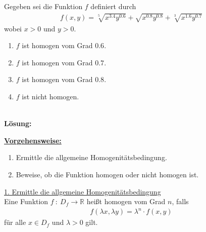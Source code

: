 \subsection*{}
Gegeben sei die Funktion $f$ definiert durch
\begin{align*}
f(x,y) = \sqrt[5]{x^{3.4}y^{0.6}}+ \sqrt{x^{0.8}y^{0.8}} 
+ \sqrt[3]{x^{1.6}y^{0.7}}
\end{align*}
wobei $x >0$ und $y> 0$.
\renewcommand{\labelenumi}{(\alph{enumi})}
\begin{enumerate}
\item $f$ ist homogen vom Grad $0.6$.
\item $f$ ist homogen vom Grad $0.7$.
\item $f$ ist homogen vom Grad $0.8$.
\item $f$ ist nicht homogen.
	
\end{enumerate}
\ \\
\textbf{Lösung:}
\begin{mdframed}
\underline{\textbf{Vorgehensweise:}}
\renewcommand{\labelenumi}{\theenumi.}
\begin{enumerate}
\item Ermittle die allgemeine Homogenitätsbedingung.
\item Beweise, ob die Funktion homogen oder nicht homogen ist.
\end{enumerate}
\end{mdframed}

\underline{1. Ermittle die allgemeine Homogenitätsbedingung} \\
Eine Funktion $f \ : \ D_f  \to \mathbb{R}$ heißt homogen vom Grad $n$, falls
\begin{align*}
f(\lambda x, \lambda y) = \lambda^n \cdot f(x,y)
\end{align*}
für alle $x \in D_f$ und $\lambda > 0$ gilt.
\\
\\


